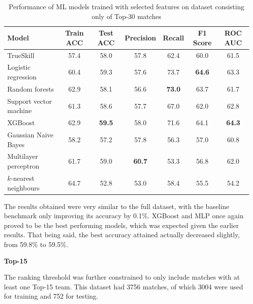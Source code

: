 \begin{table}[h!]
	\centering
	\small
	\begin{adjustbox}{center} %
		\begin{tabular}{ |l|c|c|c|c|c|c| }
			\hline
			\rule{0pt}{2.6ex} \textbf{Model} & \textbf{Train ACC} & \textbf{Test ACC} & \textbf{Precision} & \textbf{Recall} & \textbf{F1 Score} & \textbf{ROC AUC} \\
			\hline
			\rule{0pt}{2.6ex} TrueSkill 				& 57.4 & 58.0 & 57.8 & 62.4 & 60.0 & 61.5 \\ \hline
			\rule{0pt}{2.6ex} Logistic regression 		& 60.4 & 59.3 & 57.6 & 73.7 & \textbf{64.6} & 63.3 \\
			\rule{0pt}{2.6ex} Random forests 			& 62.9 & 58.1 & 56.6 & \textbf{73.0} & 63.7 & 61.7 \\
			\rule{0pt}{2.6ex} Support vector machine 	& 61.3 & 58.6 & 57.7 & 67.0 & 62.0 & 62.8 \\
			\rule{0pt}{2.6ex} XGBoost 					& 62.9 & \textbf{59.5} & 58.0 & 71.6 & 64.1 & \textbf{64.3} \\
			\rule{0pt}{2.6ex} Gaussian Naive Bayes 		& 58.2 & 57.2 & 57.8 & 56.3 & 57.0 & 60.8 \\
			\rule{0pt}{2.6ex} Multilayer perceptron		& 61.7 & 59.0 & \textbf{60.7} & 53.3 & 56.8 & 62.0 \\
			\rule{0pt}{2.6ex} $k$-nearest neighbours 	& 64.7 & 52.8 & 53.0 & 58.4 & 55.5 & 54.2 \\
			\hline
		\end{tabular}
	\end{adjustbox}
	\caption{Performance of ML models trained with selected features on dataset consisting only of Top-30 matches}
	\label{table:4}
\end{table}

The results obtained were very similar to the full dataset, with the baseline benchmark only improving its accuracy by 0.1\%. XGBoost and MLP once again proved to be the best performing models, which was expected given the earlier results. That being said, the best accuracy attained actually decreased slightly, from 59.8\% to 59.5\%.

\textbf{Top-15}

The ranking threshold was further constrained to only include matches with at least one Top-15 team. This dataset had 3756 matches, of which 3004 were used for training and 752 for testing.


